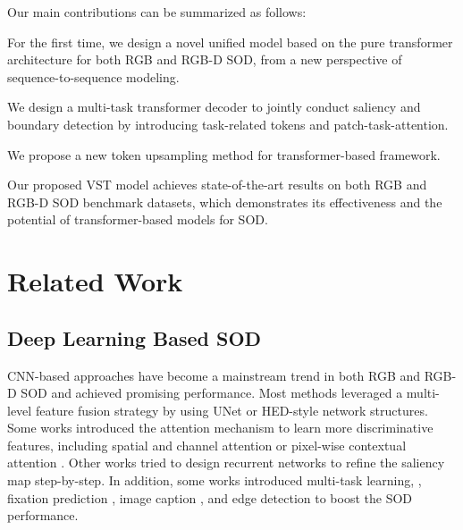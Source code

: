 \documentclass[10pt,twocolumn,letterpaper]{article}
\begin{document}
Our main contributions can be summarized as follows:
\begin{compactitem}
\item For the first time, we design a novel unified model based on the pure transformer architecture for both RGB and RGB-D SOD, from a new perspective of sequence-to-sequence modeling.

\item We design a multi-task transformer decoder to jointly conduct saliency and boundary detection by introducing task-related tokens and patch-task-attention.

\item We propose a new token upsampling method for transformer-based framework.


\item Our proposed VST model achieves state-of-the-art results on both RGB and RGB-D SOD benchmark datasets, which demonstrates its effectiveness and the potential of transformer-based models for SOD.

\end{compactitem}

\section{Related Work}

\subsection{Deep Learning Based SOD}








CNN-based approaches have become a mainstream trend in both RGB and RGB-D SOD and achieved promising performance.
Most methods \cite{hou2018dss,wang2017stagewise,MINet-CVPR2020,GateNet,fan2020bbsnet} leveraged a multi-level feature fusion strategy
by using UNet \cite{ronneberger2015unet} or HED-style \cite{xie2015hed} network structures.
Some works introduced the attention mechanism to learn more discriminative features, including spatial and channel attention \cite{Piao2019dmra,zhang2018pagr,fan2020bbsnet,chen2020dpanet} or pixel-wise contextual attention \cite{liu2018picanet}.
Other works \cite{liu2016dhsnet,wang2018rfcn,deng2018r3net,liu2019salient,chen2020PGAR} tried to design recurrent networks to refine the saliency map step-by-step.
In addition, some works introduced multi-task learning, \eg, fixation prediction \cite{wang2018salient}, image caption \cite{zhang2019capsal}, and edge detection \cite{qin2019basnet, zhao2019EGNet,CVPR2020_LDF,zhang2020select,Wei2020CoNet} to boost the SOD performance.
\end{document}
